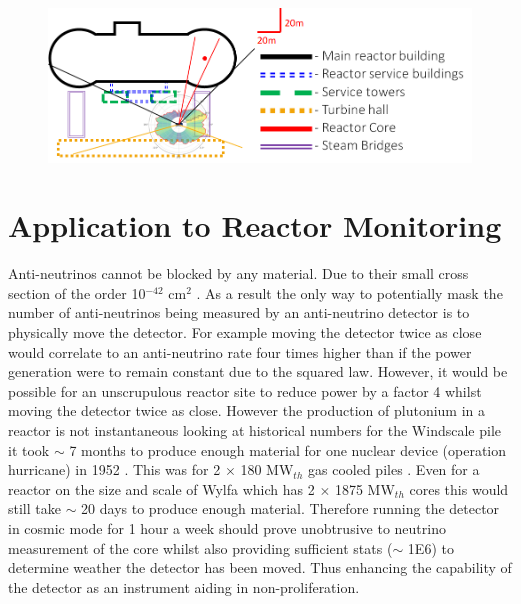 \documentclass[12pt,a4paper]{article}
\begin{document}
\begin{figure}[H]
 \centering
 \includegraphics[width=1.0\linewidth]{greyscaleFriendlyTrace/wylfaTraceOfBuildingsRedo+Overlay.png}
 \label{fig:wylfaTraceOfBuildings+overlay}
\end{figure}

\section{Application to Reactor Monitoring} \label{sec:ApplicationToReactorMonitoring}
Anti-neutrinos cannot be blocked by any material. Due to their small cross section of the order 10$^{-42}$ cm$^2$ \cite{Vogel_1999}. As a result the only way to potentially mask the number of anti-neutrinos being measured by an anti-neutrino detector is to physically move the detector. For example moving the detector twice as close would correlate to an anti-neutrino rate four times higher than if the power generation were to remain constant due to the squared law.  However, it would be possible for an unscrupulous reactor site to reduce power by a factor 4 whilst moving the detector twice as close. However the production of plutonium in a reactor is not instantaneous looking at historical numbers for the Windscale pile it took $\sim$ 7 months to produce enough material for one nuclear device (operation hurricane) in 1952 \cite{arnold2016windscale}. This was for 2 $\times$ 180 MW$_{th}$ gas cooled piles \cite{arnold2016windscale}. Even for a reactor on the size and scale of Wylfa which has 2 $\times$ 1875 MW$_{th}$ cores \cite{jensen1999description} this would still take $\sim$ 20 days to produce enough material. Therefore running the detector in cosmic mode for 1 hour a week should prove unobtrusive to neutrino measurement of the core whilst also providing sufficient stats ($\sim$ 1E6) to determine weather the detector has been moved. Thus enhancing the capability of the detector as an instrument aiding in non-proliferation. 
\end{document}
